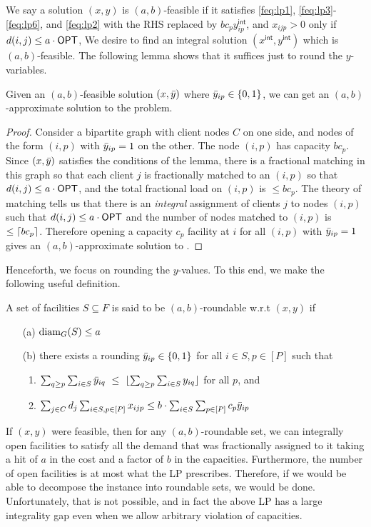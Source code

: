 \noindent		
We say a solution $(x,y)$ is $(a,b)$-feasible if it satisfies \eqref{feq:lp1}, \eqref{feq:lp3}-\eqref{feq:lp6}, and \eqref{feq:lp2} with the RHS replaced by $bc_py^\mathsf{int}_{ip}$, and $x_{ijp} > 0$ only if $d(i,j) \leq a\cdot \mathsf{OPT}$,
We desire to find an integral solution $(x^\mathsf{int},y^\mathsf{int})$ which is $(a,b)$-feasible.
The following lemma shows that it suffices just to round the $y$-variables.
\begin{claim}
Given an $(a,b)$-feasible solution $(x,\bar{y})$ where $\bar{y}_{ip}\in \{0,1\}$,
we can get  an $(a,b)$-approximate solution to the \mckc problem.
\end{claim}
\begin{proof}
Consider a bipartite graph with client nodes $C$ on one side, and nodes of the form $(i,p)$ with $\bar{y}_{ip} = 1$ on the other. The node $(i,p)$ has capacity $bc_p$.
Since $(x,\bar{y})$ satisfies the conditions of the lemma, there is a fractional matching in this graph so that each client $j$  is fractionally matched to an $(i,p)$ so that $d(i,j)\leq a\cdot \mathsf{OPT}$,
and the total fractional load on $(i,p)$ is $\leq bc_p$. The theory of matching tells us that there is an {\em integral} assignment of clients $j$ to nodes $(i,p)$ such that $d(i,j)\leq a\cdot\mathsf{OPT}$
and the number of nodes matched to $(i,p)$ is $\leq \lceil bc_p\rceil$. Therefore opening a capacity $c_p$ facility at $i$ for all $(i,p)$ with $\bar{y}_{ip} = 1$ gives an $(a,b)$-approximate solution to \mckc.
\end{proof}
\noindent
Henceforth, we focus on rounding the $y$-values. To this end, we make the following useful definition.
\begin{definition}\label{fdef:rnding-mkc}
	A set of facilities $S\subseteq F$ is said to be $(a,b)$-roundable w.r.t $(x,y)$ if
	\begin{itemize}[noitemsep]
		\item[(a)] $\mathrm{diam}_G(S) \leq a$
		\item[(b)] there exists a rounding $\bar{y}_{ip} \in \{0,1\}$ for all $i \in S, p\in [P]$ such that
		\begin{enumerate}
			\item $\sum_{q \geq p} \sum_{i\in S} \bar{y}_{iq} ~\leq~ \lfloor\sum_{q \geq p}\sum_{i\in S} y_{iq}\rfloor$ for all $p$, and
			\item $\sum_{j\in C} d_j \sum_{i\in S,p\in [P]} x_{ijp} \leq b\cdot \sum_{i\in S} \sum_{p\in [P]} c_p \bar{y}_{ip}$
		\end{enumerate}
	\end{itemize}
\end{definition}
\noindent
If $(x,y)$ were feasible, then for any $(a,b)$-roundable set, we can integrally open facilities to satisfy all the demand that was fractionally assigned to it taking a hit of $a$ in the cost and a factor of $b$ in the capacities. Furthermore, the number of open facilities is at most what the LP prescribes. Therefore, if we would be able to decompose the instance into roundable sets, we would be done.
Unfortunately, that is not possible, and in fact the above LP has a large integrality gap even when we allow arbitrary violation of capacities.

